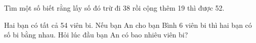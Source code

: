 \begin{ex} %
Tìm một số biết rằng lấy số đó trừ đi 38 rồi cộng thêm 19 thì được 52.
\end{ex}

\begin{ex} %
Hai bạn có tất cả 54 viên bi. Nếu bạn An cho bạn Bình 6 viên bi thì hai bạn có số bi bằng nhau. Hỏi lúc đầu bạn An có bao nhiêu viên bi?
\end{ex}
